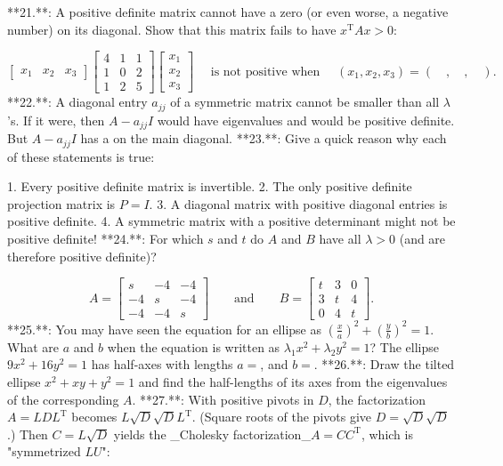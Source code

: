 

**21.**: A positive definite matrix cannot have a zero (or even worse, a negative number) on its diagonal. Show that this matrix fails to have \(x^{\mathrm{T}}Ax>0\):

\[\begin{bmatrix}x_{1}&x_{2}&x_{3}\end{bmatrix}\begin{bmatrix}4&1&1\\ 1&0&2\\ 1&2&5\end{bmatrix}\begin{bmatrix}x_{1}\\ x_{2}\\ x_{3}\end{bmatrix}\quad\text{ is not positive when }\quad(x_{1},x_{2},x_{3})=(\quad,\quad,\quad).\]
**22.**: A diagonal entry \(a_{jj}\) of a symmetric matrix cannot be smaller than all \(\lambda\)'s. If it were, then \(A-a_{jj}I\) would have eigenvalues and would be positive definite. But \(A-a_{jj}I\) has a on the main diagonal.
**23.**: Give a quick reason why each of these statements is true:

1. Every positive definite matrix is invertible.
2. The only positive definite projection matrix is \(P=I\).
3. A diagonal matrix with positive diagonal entries is positive definite.
4. A symmetric matrix with a positive determinant might not be positive definite!
**24.**: For which \(s\) and \(t\) do \(A\) and \(B\) have all \(\lambda>0\) (and are therefore positive definite)?

\[A=\begin{bmatrix}s&-4&-4\\ -4&s&-4\\ -4&-4&s\end{bmatrix}\qquad\text{and}\qquad B=\begin{bmatrix}t&3&0\\ 3&t&4\\ 0&4&t\end{bmatrix}.\]
**25.**: You may have seen the equation for an ellipse as \((\frac{x}{a})^{2}+(\frac{y}{b})^{2}=1\). What are \(a\) and \(b\) when the equation is written as \(\lambda_{1}x^{2}+\lambda_{2}y^{2}=1\)? The ellipse \(9x^{2}+16y^{2}=1\) has half-axes with lengths \(a=\), and \(b=\).
**26.**: Draw the tilted ellipse \(x^{2}+xy+y^{2}=1\) and find the half-lengths of its axes from the eigenvalues of the corresponding \(A\).
**27.**: With positive pivots in \(D\), the factorization \(A=LDL^{\mathrm{T}}\) becomes \(L\sqrt{D}\sqrt{D}L^{\mathrm{T}}\). (Square roots of the pivots give \(D=\sqrt{D}\sqrt{D}\).) Then \(C=L\sqrt{D}\) yields the _Cholesky factorization_\(A=CC^{\mathrm{T}}\), which is "symmetrized \(LU\)":

